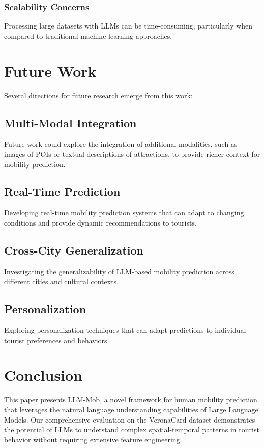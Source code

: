 \documentclass[12pt,a4paper]{article}
\begin{document}
\subsubsection{Scalability Concerns}
Processing large datasets with LLMs can be time-consuming, particularly when compared to traditional machine learning approaches.

\section{Future Work}

Several directions for future research emerge from this work:

\subsection{Multi-Modal Integration}
Future work could explore the integration of additional modalities, such as images of POIs or textual descriptions of attractions, to provide richer context for mobility prediction.

\subsection{Real-Time Prediction}
Developing real-time mobility prediction systems that can adapt to changing conditions and provide dynamic recommendations to tourists.

\subsection{Cross-City Generalization}
Investigating the generalizability of LLM-based mobility prediction across different cities and cultural contexts.

\subsection{Personalization}
Exploring personalization techniques that can adapt predictions to individual tourist preferences and behaviors.

\section{Conclusion}

This paper presents LLM-Mob, a novel framework for human mobility prediction that leverages the natural language understanding capabilities of Large Language Models. Our comprehensive evaluation on the VeronaCard dataset demonstrates the potential of LLMs to understand complex spatial-temporal patterns in tourist behavior without requiring extensive feature engineering.
\end{document}
